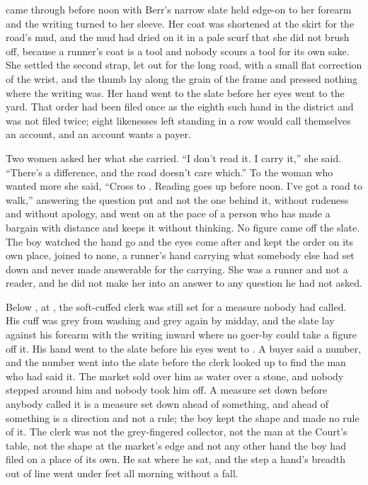  came through before noon with Berr's narrow slate held edge-on to her forearm and the writing turned to her sleeve. Her coat was shortened at the skirt for the road's mud, and the mud had dried on it in a pale scurf that she did not brush off, because a runner's coat is a tool and nobody scours a tool for its own sake. She settled the second strap, let out for the long road, with a small flat correction of the wrist, and the thumb lay along the grain of the frame and pressed nothing where the writing was. Her hand went to the slate before her eyes went to the yard. That order had been filed once as the eighth such hand in the district and was not filed twice; eight likenesses left standing in a row would call themselves an account, and an account wants a payer.

Two women asked her what she carried. “I don't read it. I carry it,” she said. “There's a difference, and the road doesn't care which.” To the woman who wanted more she said, “Cross to . Reading goes up before noon. I've got a road to walk,” answering the question put and not the one behind it, without rudeness and without apology, and went on at the pace of a person who has made a bargain with distance and keeps it without thinking. No figure came off the slate. The boy watched the hand go and the eyes come after and kept the order on its own place, joined to none, a runner's hand carrying what somebody else had set down and never made answerable for the carrying. She was a runner and not a reader, and he did not make her into an answer to any question he had not asked.

Below , at , the soft-cuffed clerk was still set for a measure nobody had called. His cuff was grey from washing and grey again by midday, and the slate lay against his forearm with the writing inward where no goer-by could take a figure off it. His hand went to the slate before his eyes went to . A buyer said a number, and the number went into the slate before the clerk looked up to find the man who had said it. The market sold over him as water over a stone, and nobody stepped around him and nobody took him off. A measure set down before anybody called it is a measure set down ahead of something, and ahead of something is a direction and not a rule; the boy kept the shape and made no rule of it. The clerk was not the grey-fingered collector, not the man at the Court's table, not the shape at the market's edge and not any other hand the boy had filed on a place of its own. He sat where he sat, and the step a hand's breadth out of line went under feet all morning without a fall.

